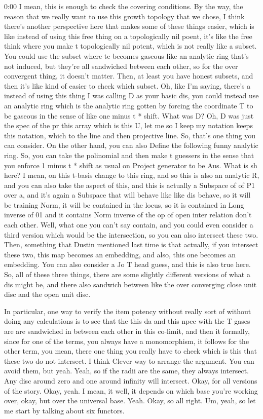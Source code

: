 \begin{unfinished}{0:00}
I mean, this is enough to check the covering conditions. By the way, the reason that we really want to use this growth topology that we chose, I think there's another perspective here that makes some of these things easier, which is like instead of using this free thing on a topologically nil poent, it's like the free think where you make t topologically nil potent, which is not really like a subset. You could use the subset where te becomes gaseous like an analytic ring that's not induced, but they're all sandwiched between each other, so for the over convergent thing, it doesn't matter. Then, at least you have honest subsets, and then it's like kind of easier to check which subset. Oh, like I'm saying, there's a instead of using this thing I was calling D as your basic dis, you could instead use an analytic ring which is the analytic ring gotten by forcing the coordinate T to be gaseous in the sense of like one minus t * shift. What was D? Oh, D was just the spec of the pr this array which is this U, let me so I keep my notation keeps this notation, which to the line and then projective line. So, that's one thing you can consider. On the other hand, you can also Define the following funny analytic ring. So, you can take the polinomial and then make t guessers in the sense that you enforce 1 minus t * shift as usual on Project generator to be Aus. What is sh here? I mean, on this t-basis change to this ring, and so this is also an analytic R, and you can also take the aspect of this, and this is actually a Subspace of of P1 over a, and it's again a Subspace that will behave like like dis behave, so it will be training Norm, it will be contained in the locus, so it is contained in Long inverse of 01 and it contains Norm inverse of the op of open inter relation don't each other. Well, what one you can't say contain, and you could even consider a third version which would be the intersection, so you can also intersect these two. Then, something that Dustin mentioned last time is that actually, if you intersect these two, this map becomes an embedding, and also, this one becomes an embedding. You can also consider a Jo T head guess, and this is also true here. So, all of these three things, there are some slightly different versions of what a dis might be, and there also sandwich between like the over converging close unit disc and the open unit disc.

In particular, one way to verify the item potency without really sort of without doing any calculations is to see that the this da and this npec with the T gases are are sandwiched in between each other in this co-limit, and then it formally, since for one of the terms, you always have a monomorphism, it follows for the other term, you mean, there one thing you really have to check which is this that these two do not intersect. I think
Clever way to arrange the argument. You can avoid them, but yeah. Yeah, so if the radii are the same, they always intersect. Any disc around zero and one around infinity will intersect. Okay, for all versions of the story. Okay, yeah. I mean, it well, it depends on which base you're working over, okay, but over the universal base. Yeah. Okay, so all right. Um, yeah, so let me start by talking about six functors.


\end{unfinished}

